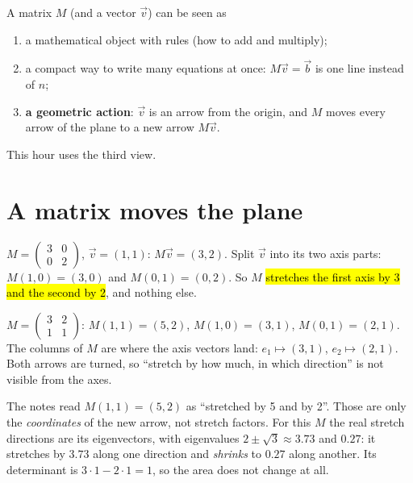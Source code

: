A matrix $M$ (and a vector $\vec v$) can be seen as
\begin{enumerate}
  \item a mathematical object with rules (how to add and multiply);
  \item a compact way to write many equations at once: $M\vec v=\vec b$ is one line instead of $n$;
  \item \textbf{a geometric action}: $\vec v$ is an arrow from the origin, and $M$ moves every arrow of the plane to a new arrow $M\vec v$.
\end{enumerate}
This hour uses the third view.

\section{A matrix moves the plane}

\begin{example}
$M=\begin{pmatrix}3&0\\0&2\end{pmatrix}$, $\vec v=(1,1)$: $M\vec v=(3,2)$. Split $\vec v$ into its two axis parts:
$M(1,0)=(3,0)$ and $M(0,1)=(0,2)$. So $M$ \hl{stretches the first axis by 3 and the second by 2}, and nothing else.
\end{example}

\begin{example}
$M=\begin{pmatrix}3&2\\1&1\end{pmatrix}$: $M(1,1)=(5,2)$, $M(1,0)=(3,1)$, $M(0,1)=(2,1)$.
The columns of $M$ are where the axis vectors land: $e_1\mapsto(3,1)$, $e_2\mapsto(2,1)$. Both arrows are turned, so ``stretch by how much, in which direction'' is not visible from the axes.
\end{example}

\begin{pitfall}
The notes read $M(1,1)=(5,2)$ as ``stretched by 5 and by 2''. Those are only the \emph{coordinates} of the new arrow, not stretch factors.
For this $M$ the real stretch directions are its eigenvectors, with eigenvalues $2\pm\sqrt3\approx3.73$ and $0.27$: it stretches by $3.73$ along one direction and \emph{shrinks} to $0.27$ along another.
Its determinant is $3\cdot1-2\cdot1=1$, so the area does not change at all.
\end{pitfall}


